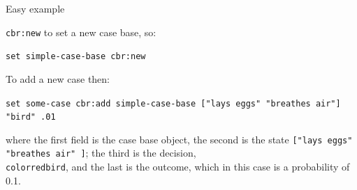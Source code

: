\documentclass[usenames,dvipsnames,10pt]{beamer} %
\begin{document}
\begin{frame}{Easy example}

    {\color{blue}\texttt{cbr:new}} to set a new case base, so:

    \vspace{0.5cm}

    \small
    \texttt{set simple-case-base {\color{blue}cbr:new}}

    \vspace{0.5cm}

    \normalsize
    To add a new case then:

    \vspace{0.5cm}

    \small
    \texttt{set some-case {\color{blue}cbr:add}  simple-case-base [{\color{red}"lays eggs" "breathes air"}] {\color{red}"bird"} .01}

    \vspace{0.5cm}

    \normalsize
    where the first field is the case base object, the second is the state \texttt{[{\color{red}"lays eggs" "breathes air"} ]}; the third is the decision, \texttt{{\\color{red}}bird}, and the last is the outcome, which in this case is a probability of 0.1.

\end{frame}
\end{document}
